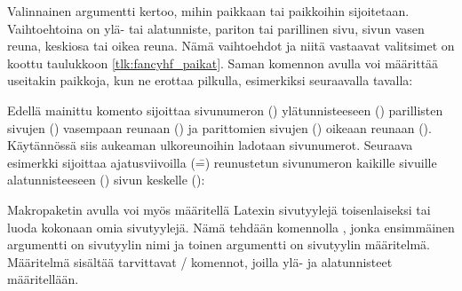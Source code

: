 Valinnainen argumentti  kertoo, mihin paikkaan tai
paikkoihin  sijoitetaan. Vaihtoehtoina on ylä- tai
alatunniste, pariton tai parillinen sivu, sivun vasen reuna, keskiosa
tai oikea reuna. Nämä vaihtoehdot ja niitä vastaavat valitsimet on
koottu taulukkoon \ref{tlk:fancyhf_paikat}. Saman komennon avulla voi
määrittää useitakin paikkoja, kun ne erottaa pilkulla, esimerkiksi
seuraavalla tavalla:


\begin{koodilohkosis}
\fancyhf{}  %
\end{koodilohkosis}

Edellä mainittu komento sijoittaa sivunumeron ()
ylätunnisteeseen () parillisten sivujen () vasempaan
reunaan () ja parittomien sivujen () oikeaan reunaan
(). Käytännössä siis aukeaman ulkoreunoihin ladotaan
sivunumerot. Seuraava esimerkki sijoittaa ajatusviivoilla (\==)
reunustetun sivunumeron kaikille sivuille alatunnisteeseen ()
sivun keskelle ():

\begin{koodilohkosis}
\fancyhf[FC]{-- \thepage\ --}
\end{koodilohkosis}

Makropaketin  avulla voi myös määritellä Latexin
sivutyylejä toisenlaiseksi tai luoda kokonaan omia sivutyylejä. Nämä
tehdään komennolla , jonka ensimmäinen
argumentti on sivutyylin nimi ja toinen argumentti on sivutyylin
määritelmä. Määritelmä sisältää tarvittavat \-/
komennot, joilla ylä- ja alatunnisteet määritellään.

